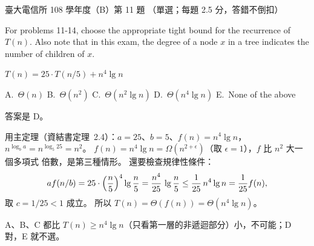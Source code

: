\begin{pastexam}[label={px:ntu-108-comm-dsab-11}]{臺大電信所 108 學年度（B）第 11 題}
（單選；每題 2.5 分，答錯不倒扣）

For problems 11-14, choose the appropriate tight bound for the recurrence of $T(n)$. Also note
that in this exam, the degree of a node $x$ in a tree indicates the number of children of $x$.

$T(n)=25\cdot T(n/5)+n^4\lg n$

A.~$\Theta(n)$ \qquad B.~$\Theta(n^2)$ \qquad C.~$\Theta(n^2\lg n)$ \qquad D.~$\Theta(n^4\lg n)$
\qquad E.~None of the above
\end{pastexam}

\begin{pastsoln}
答案是 D。

用主定理（資結書定理~2.4）：$a = 25$、$b = 5$、$f(n) = n^4 \lg n$，$n^{\log_b a} = n^{\log_5 25} =
n^2$。 $f(n) = n^4 \lg n = \Omega(n^{2 + \epsilon})$（取 $\epsilon = 1$），$f$ 比 $n^2$ 大一個多項式
倍數，是第三種情形。 還要檢查規律性條件：
\[
a f(n/b) = 25 \cdot \Bigl(\frac{n}{5}\Bigr)^4 \lg \frac{n}{5} = \frac{n^4}{25}\,\lg\frac{n}{5}
\le \frac{1}{25}\, n^4 \lg n = \frac{1}{25} f(n),
\]
取 $c = 1/25 < 1$ 成立。 所以 $T(n) = \Theta(f(n)) = \Theta(n^4 \lg n)$。

A、B、C 都比 $T(n) \ge n^4 \lg n$（只看第一層的非遞迴部分）小，不可能；D 對，E 就不選。
\end{pastsoln}
